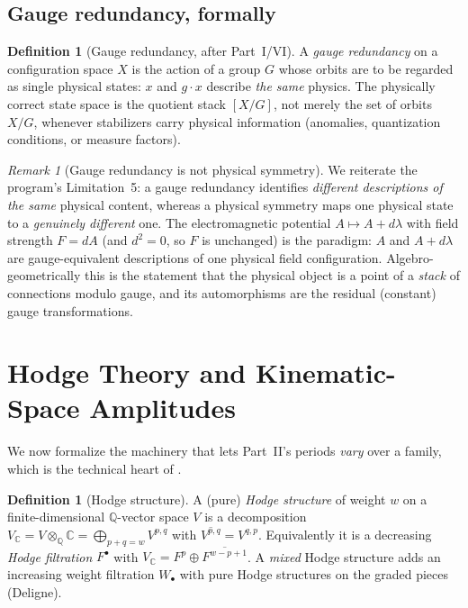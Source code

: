 \documentclass[12pt]{article}
\theoremstyle{definition}
\newtheorem{definition}[theorem]{Definition}
\theoremstyle{remark}
\newtheorem{remark}[theorem]{Remark}
\newcommand{\CC}{\mathbb{C}}
\newcommand{\QQ}{\mathbb{Q}}
\newcommand{\Fil}{F^{\bullet}}
\begin{document}
\subsection{Gauge redundancy, formally}

\begin{definition}[Gauge redundancy, after Part~I/VI]
\label{def:gauge}
A \emph{gauge redundancy} on a configuration space $X$ is the action of a group $G$ whose orbits are to
be regarded as single physical states: $x$ and $g\cdot x$ describe \emph{the same} physics. The
physically correct state space is the quotient stack $[X/G]$, not merely the set of orbits $X/G$,
whenever stabilizers carry physical information (anomalies, quantization conditions, or measure
factors).
\end{definition}

\begin{remark}[Gauge redundancy is not physical symmetry]
\label{rem:gauge-not-sym}
We reiterate the program's Limitation~5: a gauge redundancy identifies \emph{different descriptions of
the same} physical content, whereas a physical symmetry maps one physical state to a \emph{genuinely
different} one. The electromagnetic potential $A\mapsto A+d\lambda$ with field strength $F=dA$
(and $d^2=0$, so $F$ is unchanged) is the paradigm: $A$ and $A+d\lambda$ are gauge-equivalent
descriptions of one physical field configuration. Algebro-geometrically this is the statement that the
physical object is a point of a \emph{stack} of connections modulo gauge, and its automorphisms are the
residual (constant) gauge transformations.
\end{remark}

\section{Hodge Theory and Kinematic-Space Amplitudes}
\label{sec:hodge}

We now formalize the machinery that lets Part~II's periods \emph{vary} over a family, which is the
technical heart of .

\begin{definition}[Hodge structure]
\label{def:hodge}
A (pure) \emph{Hodge structure} of weight $w$ on a finite-dimensional $\QQ$-vector space $V$ is a
decomposition $V_\CC = V\otimes_\QQ\CC = \bigoplus_{p+q=w} V^{p,q}$ with $\overline{V^{p,q}}=V^{q,p}$.
Equivalently it is a decreasing \emph{Hodge filtration} $\Fil$ with
$V_\CC = F^p\oplus\overline{F^{w-p+1}}$. A \emph{mixed} Hodge structure adds an increasing weight
filtration $W_\bullet$ with pure Hodge structures on the graded pieces (Deligne).
\end{definition}
\end{document}
